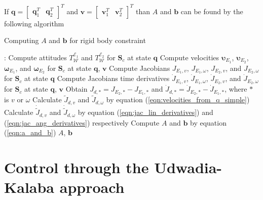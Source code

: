 If $\mathbf{q} = \begin{bmatrix} \mathbf{q}_1^T & \mathbf{q}_2^T \end{bmatrix}^T$ 
and $\mathbf{v} = \begin{bmatrix} \mathbf{v}_1^T & \mathbf{v}_2^T \end{bmatrix}^T$ 
than $A$ and $\mathbf{b}$ can be found by the following algorithm

\begin{algorithm}[H]
    \caption{Computing $A$ and $\mathbf{b}$ for rigid body constraint}

    \begin{algorithmic}[1]
         : 
        \State Compute attitudes $T_{\mathcal{W}}^{\mathcal{E}_1}$ and 
        $T_{\mathcal{W}}^{\mathcal{E}_2}$ for $\mathbf{S}_c$ at state $\mathbf{q}$
        \State Compute velocities $\boldsymbol{\upsilon}_{E_1}$, 
        $\boldsymbol{\upsilon}_{E_2}$, $\boldsymbol{\omega}_{E_1}$, and 
        $\boldsymbol{\omega}_{E_2}$ for $\mathbf{S}_c$ at state $\mathbf{q}$, 
        $\mathbf{v}$
        \State Compute Jacobians $J_{E_1, v}$, $J_{E_1, \omega}$, $J_{E_2, v}$, and 
        $J_{E_2, \omega}$ for $\mathbf{S}_c$ at state $\mathbf{q}$
        \State Compute Jacobians time derivatives $\dot{J}_{E_1, v}$, 
        $\dot{J}_{E_1, \omega}$, $\dot{J}_{E_2, v}$, and $\dot{J}_{E_2, \omega}$ 
        for $\mathbf{S}_c$ at state $\mathbf{q}$, $\mathbf{v}$
        \State Obtain $J_{d, *} = J_{E_2, *} - J_{E_1, *}$ and 
        $\dot{J}_{d, *} = \dot{J}_{E_2, *} - \dot{J}_{E_1, *}$, where $*$ is 
        $v$ or $\omega$
        \State Calculate $\tilde{J}_{d,v}$ and $\tilde{J}_{d, \omega}$ by equation 
        (\ref{eqn:velocities_from_q_simple})
        \State Calculate $\dot{\tilde{J}}_{d,v}$ and $\dot{\tilde{J}}_{d, \omega}$ by 
        equation (\ref{eqn:jac_lin_derivatives}) and (\ref{eqn:jac_ang_derivatives}) 
        respectively
        \State Compute $A$ and $\mathbf{b}$ by equation (\ref{eqn:a_and_b})
        \State \Return $A$, $\mathbf{b}$
        \EndFunction
    \end{algorithmic}

    \label{alg:get_a_and_b}
\end{algorithm}

\section{Control through the Udwadia-Kalaba approach}

